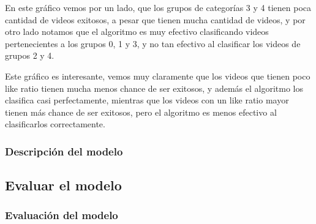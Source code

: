         \def\path{clasif_error_category.png}
        \def\text{Clasif. errors vs category}
        \def\scale{.7}
        

        En este gráfico vemos por un lado, que los grupos de categorías 3 y 4
        tienen poca cantidad de videos exitosos, a pesar que tienen mucha
        cantidad de videos, y por otro lado notamos que el algoritmo es muy
        efectivo clasificando videos pertenecientes a los grupos 0, 1 y 3, y
        no tan efectivo al clasificar los videos de grupos 2 y 4.

        \def\path{clasif_error_likes_ratio.png}
        \def\text{Clasif. errors vs like ratio}
        \def\scale{.7}
        

        Este gráfico es interesante, vemos muy claramente que los videos que
        tienen poco like ratio tienen mucha menos chance de ser exitosos, y
        además el algoritmo los clasifica casi perfectamente, mientras que los
        videos con un like ratio mayor tienen más chance de ser exitosos, pero
        el algoritmo es menos efectivo al clasificarlos correctamente.

        \newpage

    \subsubsection{Descripción del modelo}
\subsection{Evaluar el modelo}
    \subsubsection{Evaluación del modelo}
